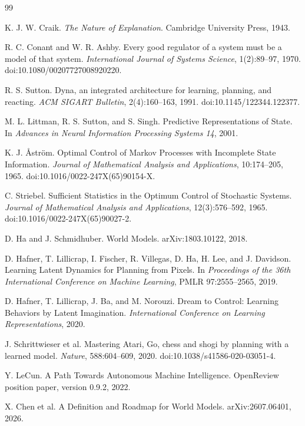 \documentclass[10pt]{article}
\begin{document}
\begin{thebibliography}{99}

K. J. W. Craik.
\emph{The Nature of Explanation}.
Cambridge University Press, 1943.

R. C. Conant and W. R. Ashby.
Every good regulator of a system must be a model of that system.
\emph{International Journal of Systems Science}, 1(2):89--97, 1970.
doi:10.1080/00207727008920220.


R. S. Sutton.
Dyna, an integrated architecture for learning, planning, and reacting.
\emph{ACM SIGART Bulletin}, 2(4):160--163, 1991.
doi:10.1145/122344.122377.

M. L. Littman, R. S. Sutton, and S. Singh.
Predictive Representations of State.
In \emph{Advances in Neural Information Processing Systems 14}, 2001.

K. J. \AA str\"om.
Optimal Control of Markov Processes with Incomplete State Information.
\emph{Journal of Mathematical Analysis and Applications}, 10:174--205, 1965.
doi:10.1016/0022-247X(65)90154-X.

C. Striebel.
Sufficient Statistics in the Optimum Control of Stochastic Systems.
\emph{Journal of Mathematical Analysis and Applications}, 12(3):576--592, 1965.
doi:10.1016/0022-247X(65)90027-2.

D. Ha and J. Schmidhuber.
World Models.
arXiv:1803.10122, 2018.

D. Hafner, T. Lillicrap, I. Fischer, R. Villegas, D. Ha, H. Lee, and J. Davidson.
Learning Latent Dynamics for Planning from Pixels.
In \emph{Proceedings of the 36th International Conference on Machine Learning}, PMLR 97:2555--2565, 2019.

D. Hafner, T. Lillicrap, J. Ba, and M. Norouzi.
Dream to Control: Learning Behaviors by Latent Imagination.
\emph{International Conference on Learning Representations}, 2020.

J. Schrittwieser et al.
Mastering Atari, Go, chess and shogi by planning with a learned model.
\emph{Nature}, 588:604--609, 2020.
doi:10.1038/s41586-020-03051-4.

Y. LeCun.
A Path Towards Autonomous Machine Intelligence.
OpenReview position paper, version 0.9.2, 2022.

X. Chen et al.
A Definition and Roadmap for World Models.
arXiv:2607.06401, 2026.


\end{thebibliography}
\end{document}
